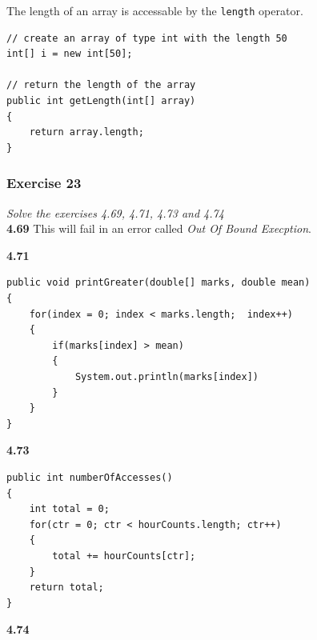 The length of an array is accessable by the \lstinline{length} operator.

\begin{lstlisting}
// create an array of type int with the length 50
int[] i = new int[50];

// return the length of the array
public int getLength(int[] array)
{
	return array.length;
}
\end{lstlisting}

\subsubsection*{Exercise 23}
\textit{Solve the exercises 4.69, 4.71, 4.73 and 4.74}\\

\textbf{4.69}
This will fail in an error called \textit{Out Of Bound Execption}.

\textbf{4.71}

\begin{lstlisting}
public void printGreater(double[] marks, double mean)
{
	for(index = 0; index < marks.length;  index++)
	{
		if(marks[index] > mean)
		{
			System.out.println(marks[index])
		}
	}
}
\end{lstlisting}

\textbf{4.73}

\begin{lstlisting}
public int numberOfAccesses()
{
	int total = 0;
	for(ctr = 0; ctr < hourCounts.length; ctr++)
	{
		total += hourCounts[ctr]; 
	}
	return total;
}
\end{lstlisting}

\textbf{4.74}
